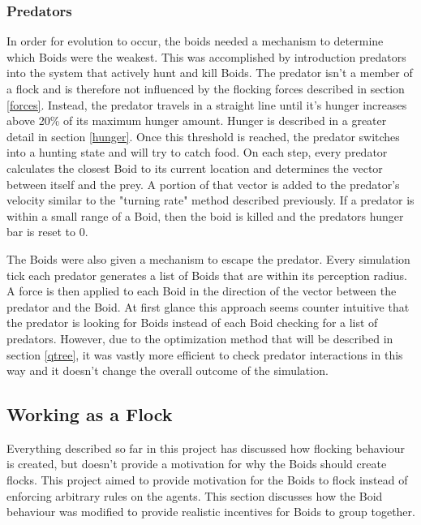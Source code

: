 \documentclass{egpubl}
\begin{document}
\subsubsection{Predators}
\label{hunting}
In order for evolution to occur, the boids needed a mechanism to determine which Boids were the weakest. This was accomplished by introduction predators into the system that actively hunt and kill Boids. The predator isn't a member of a flock and is therefore not influenced by the flocking forces described in section \ref{forces}. Instead, the predator travels in a straight line until it's hunger increases above 20\% of its maximum hunger amount. Hunger is described in a greater detail in section \ref{hunger}. Once this threshold is reached, the predator switches into a hunting state and will try to catch food. On each step, every predator calculates the closest Boid to its current location and determines the vector between itself and the prey. A portion of that vector is added to the predator's velocity similar to the "turning rate" method described previously. If a predator is within a small range of a Boid, then the boid is killed and the predators hunger bar is reset to 0. 
\par
The Boids were also given a mechanism to escape the predator. Every simulation tick each predator generates a list of Boids that are within its perception radius. A force is then applied to each Boid in the direction of the vector between the predator and the Boid. At first glance this approach seems counter intuitive that the predator is looking for Boids instead of each Boid checking for a list of predators. However, due to the optimization method that will be described in section \ref{qtree}, it was vastly more efficient to check predator interactions in this way and it doesn't change the overall outcome of the simulation.
\subsection{Working as a Flock}
Everything described so far in this project has discussed how flocking behaviour is created, but doesn't provide a motivation for why the Boids should create flocks. This project aimed to provide motivation for the Boids to flock instead of enforcing arbitrary rules on the agents. This section discusses how the Boid behaviour was modified to provide realistic incentives for Boids to group together.
\end{document}
